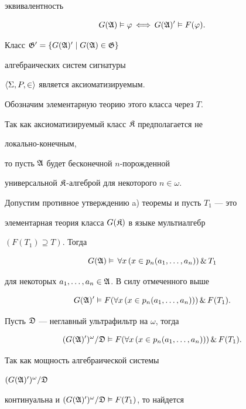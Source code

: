 \begin{pf}
эквивалентность 


$$ 


G(\frak A)\vDash\varphi\,\Longleftrightarrow\, 


G(\frak A)'\vDash F(\varphi). 


$$ 


Класс $\frak G'=\{G(\frak A)'\mid G(\frak A)\in\frak G\}$ 


алгебраических систем сигнатуры 


$\langle\Sigma,P,\in\rangle$ является аксиоматизируемым.


Обозначим элементарную теорию этого класса через $T$. 


 


Так как аксиоматизируемый класс $\frak K$ предполагается не 


локально-конечным, 


то пусть $\frak A$ будет бесконечной $n$-порожденной 


универсальной $\frak K$-алгеброй для некоторого $n\in\omega$. 


Допустим противное утверждению a) теоремы и пусть $T_1$ --- это


элементарная теория класса $G(\frak K)$ в языке мультиалгебр 


$(F(T_1)\supseteq T)$. Тогда 


$$ 


G(\frak A)\vDash\,\forall x\,(x\in p_n(a_1,\dotsc,a_n)) 


\,\&\,T_1 


$$ 


для некоторых $a_1,\dotsc,a_n\in\frak A$. В силу отмеченного выше 


$$ 


G(\frak A)'\vDash F(\forall x\,(x\in p_n(a_1,\dotsc,a_n))) 


\,\&\, F(T_1). 


$$ 


Пусть $\frak D$ --- неглавный ультрафильтр на $\omega$, тогда 


$$ 


(G(\frak A)')^\omega/\frak D\vDash F(\forall x\, 


(x\in p_n(a_1,\dotsc,a_n)))\,\&\, F(T_1). 


$$ 


Так как мощность алгебраической системы 


$(G(\frak A)')^\omega/\frak D$ 


континуальна и $(G(\frak A)')^\omega/\frak D\vDash F(T_1)$, то найдется 



\end{pf}
